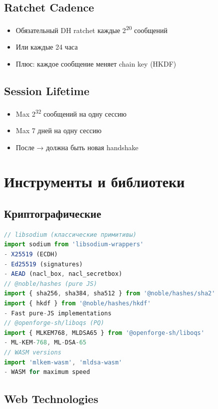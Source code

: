 \documentclass[11pt,a4paper,oneside]{book}
\begin{document}
\vspace{-0.2cm}\subsection{Ratchet Cadence}
\begin{itemize}
  \item Обязательный DH ratchet каждые 2\textsuperscript{20} сообщений
  \item Или каждые 24 часа
  \item Плюс: каждое сообщение меняет chain key (HKDF)
\end{itemize}
\vspace{-0.2cm}\subsection{Session Lifetime}
\begin{itemize}
  \item Max 2\textsuperscript{32} сообщений на одну сессию
  \item Max 7 дней на одну сессию
  \item После → должна быть новая handshake
\end{itemize}
\vspace{-0.3cm}\section{Инструменты и библиотеки}
\vspace{-0.2cm}\subsection{Криптографические}
\begin{lstlisting}[language=TypeScript]
// libsodium (классические примитивы)
import sodium from 'libsodium-wrappers'
- X25519 (ECDH)
- Ed25519 (signatures)
- AEAD (nacl_box, nacl_secretbox)
// @noble/hashes (pure JS)
import { sha256, sha384, sha512 } from '@noble/hashes/sha2'
import { hkdf } from '@noble/hashes/hkdf'
- Fast pure-JS implementations
// @openforge-sh/liboqs (PQ)
import { MLKEM768, MLDSA65 } from '@openforge-sh/liboqs'
- ML-KEM-768, ML-DSA-65
// WASM versions
import 'mlkem-wasm', 'mldsa-wasm'
- WASM for maximum speed
\end{lstlisting}
\vspace{-0.2cm}\subsection{Web Technologies}
\end{document}
